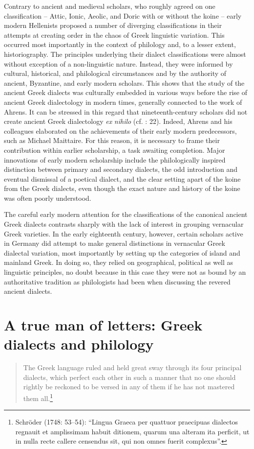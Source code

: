 Contrary to ancient and medieval scholars, who roughly agreed on one classification – Attic, Ionic, Aeolic, and Doric with or without the koine – early modern Hellenists proposed a number of diverging classifications in their attempts at creating order in the chaos of Greek linguistic variation. This occurred most importantly in the context of philology and, to a lesser extent, historiography. The principles underlying their dialect classifications were almost without exception of a non-linguistic nature. Instead, they were informed by cultural, historical, and philological circumstances and by the authority of ancient, Byzantine, and early modern scholars. This shows that the study of the ancient Greek dialects was culturally embedded in various ways before the rise of ancient Greek dialectology in modern times, generally connected to the work of Ahrens. It can be stressed in this regard that nineteenth-century scholars did not create ancient Greek dialectology \textit{ex} \textit{nihilo} (cf. \citealt{Colvin2007}: 22). Indeed, Ahrens and his colleagues elaborated on the achievements of their early modern predecessors, such as Michael Maittaire. For this reason, it is necessary to frame their contribution within earlier scholarship, a task awaiting completion. Major innovations of early modern scholarship include the philologically inspired distinction between primary and secondary dialects, the odd introduction and eventual dismissal of a poetical dialect, and the clear setting apart of the koine from the Greek dialects, even though the exact nature and history of the koine was often poorly understood.

The careful early modern attention for the classifications of the canonical ancient Greek dialects contrasts sharply with the lack of interest in grouping vernacular Greek varieties. In the early eighteenth century, however, certain scholars active in Germany did attempt to make general distinctions in vernacular Greek dialectal variation, most importantly by setting up the categories of island and mainland Greek. In doing so, they relied on geographical, political as well as linguistic principles, no doubt because in this case they were not as bound by an authoritative tradition as philologists had been when discussing the revered ancient dialects.

\chapter{A true man of letters: Greek dialects and philology}
\begin{quote}
The Greek language ruled and held great sway through its four principal dialects, which perfect each other in such a manner that no one should rightly be reckoned to be versed in any of them if he has not mastered them all.\footnote{Schröder (1748: 53–54): “Lingua Graeca per quattuor praecipuas dialectos regnauit et amplissimam habuit ditionem, quarum una alteram ita perficit, ut in nulla recte callere censendus sit, qui non omnes fuerit complexus”.}
\end{quote}

